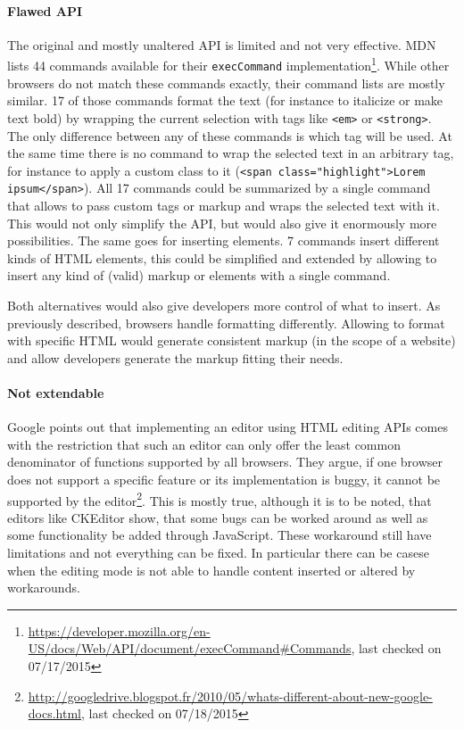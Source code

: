 \paragraph{Flawed API} 

The original and mostly unaltered API is limited and not very effective. MDN lists 44 commands available for their \texttt{execCommand} implementation\footnote{\url{https://developer.mozilla.org/en-US/docs/Web/API/document/execCommand\#Commands}, last checked on 07/17/2015}. While other browsers do not match these commands exactly, their command lists are mostly similar. 17 of those commands format the text (for instance to italicize or make text bold) by wrapping the current selection with tags like \texttt{<em>} or \texttt{<strong>}. The only difference between any of these commands is which tag will be used. At the same time there is no command to wrap the selected text in an arbitrary tag, for instance to apply a custom class to it (\texttt{<span class="highlight">Lorem ipsum</span>}). All 17 commands could be summarized by a single command that allows to pass custom tags or markup and wraps the selected text with it. This would not only simplify the API, but would also give it enormously more possibilities. The same goes for inserting elements. 7 commands insert different kinds of HTML elements, this could be simplified and extended by allowing to insert any kind of (valid) markup or elements with a single command. 

Both alternatives would also give developers more control of what to insert. As previously described, browsers handle formatting differently. Allowing to format with specific HTML would generate consistent markup (in the scope of a website) and allow developers generate the markup fitting their needs.


\paragraph{Not extendable}

Google points out that implementing an editor using HTML editing APIs comes with the restriction that such an editor can only offer the least common denominator of functions supported by all browsers. They argue, if one browser does not support a specific feature or its implementation is buggy, it cannot be supported by the editor\footnote{\url{http://googledrive.blogspot.fr/2010/05/whats-different-about-new-google-docs.html}, last checked on 07/18/2015}. This is mostly true, although it is to be noted, that editors like CKEditor show, that some bugs can be worked around as well as some functionality be added through JavaScript. These workaround still have limitations and not everything can be fixed. In particular there can be casese when the editing mode is not able to handle content inserted or altered by workarounds.

